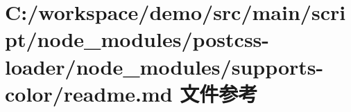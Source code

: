 \hypertarget{node__modules_2postcss-loader_2node__modules_2supports-color_2_r_e_a_d_m_e_8md}{}\section{C\+:/workspace/demo/src/main/script/node\+\_\+modules/postcss-\/loader/node\+\_\+modules/supports-\/color/readme.md 文件参考}
\label{node__modules_2postcss-loader_2node__modules_2supports-color_2_r_e_a_d_m_e_8md}
